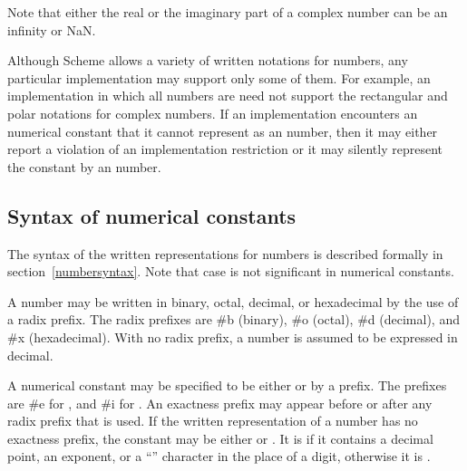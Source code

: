 Note that either the real or the imaginary part of a complex number
can be an infinity or NaN.

Although Scheme allows a variety of written
notations for
numbers, any particular implementation may support only some of them.
For example, an implementation in which all numbers are 
need not support the rectangular and polar notations for complex
numbers.  If an implementation encounters an  numerical constant that
it cannot represent as an  number, then it may either report a
violation of an implementation restriction or it may silently represent the
constant by an  number.


\subsection{Syntax of numerical constants}
\label{numbernotations}


%

The syntax of the written representations for numbers is described formally in
section~\ref{numbersyntax}.  Note that case is not significant in numerical
constants.


A number may be written in binary, octal, decimal, or
hexadecimal by the use of a radix prefix.  The radix prefixes are {\cf
\#b} (binary), {\cf \#o} (octal), {\cf
\#d} (decimal), and {\cf \#x} (hexadecimal).  With
no radix prefix, a number is assumed to be expressed in decimal.

A
numerical constant may be specified to be either  or
 by a prefix.  The prefixes are {\cf \#e}
for , and {\cf \#i} for .  An exactness
prefix may appear before or after any radix prefix that is used.  If
the written representation of a number has no exactness prefix, the
constant may be either  or .  It is
 if it contains a decimal point, an
exponent, or a ``\sharpsign'' character in the place of a digit,
otherwise it is .
%

